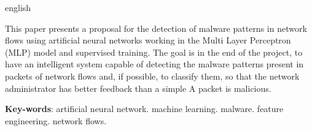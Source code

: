 \begin{resumo}[Abstract]
 \begin{otherlanguage*}{english}

   This paper presents a proposal for the detection of malware patterns in network flows using artificial neural networks working in the Multi Layer Perceptron (MLP) model and supervised training. The goal is in the end of the project, to have an intelligent system capable of detecting the malware patterns present in packets of network flows and, if possible, to classify them, so that the network administrator has better feedback than a simple A packet is malicious.

   \vspace{\onelineskip}

   \noindent
   \textbf{Key-words}: artificial neural network. machine learning. malware. feature engineering. network flows.
 \end{otherlanguage*}
\end{resumo}
